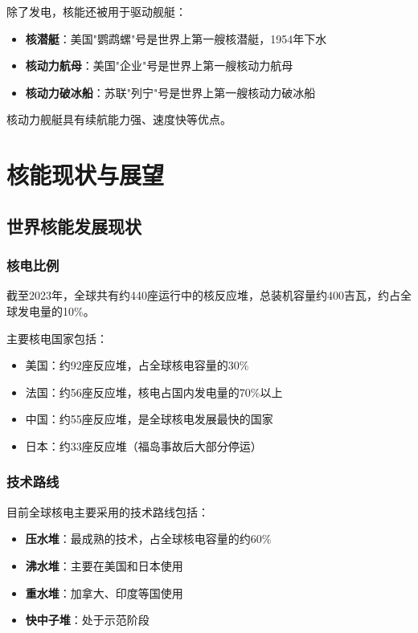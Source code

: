 \documentclass[12pt,UTF8]{ctexbook}
\begin{document}
除了发电，核能还被用于驱动舰艇：

\begin{itemize}[leftmargin=2cm]
    \item \textbf{核潜艇}：美国"鹦鹉螺"号是世界上第一艘核潜艇，1954年下水
    \item \textbf{核动力航母}：美国"企业"号是世界上第一艘核动力航母
    \item \textbf{核动力破冰船}：苏联"列宁"号是世界上第一艘核动力破冰船
\end{itemize}

核动力舰艇具有续航能力强、速度快等优点。

\part{核能现状与展望}

\chapter{世界核能发展现状}

\section{核电比例}

截至2023年，全球共有约440座运行中的核反应堆，总装机容量约400吉瓦，约占全球发电量的10\%。

主要核电国家包括：
\begin{itemize}[leftmargin=2cm]
    \item 美国：约92座反应堆，占全球核电容量的30\%
    \item 法国：约56座反应堆，核电占国内发电量的70\%以上
    \item 中国：约55座反应堆，是全球核电发展最快的国家
    \item 日本：约33座反应堆（福岛事故后大部分停运）
\end{itemize}

\section{技术路线}

目前全球核电主要采用的技术路线包括：

\begin{itemize}[leftmargin=2cm]
    \item \textbf{压水堆}：最成熟的技术，占全球核电容量的约60\%
    \item \textbf{沸水堆}：主要在美国和日本使用
    \item \textbf{重水堆}：加拿大、印度等国使用
    \item \textbf{快中子堆}：处于示范阶段
\end{itemize}
\end{document}
